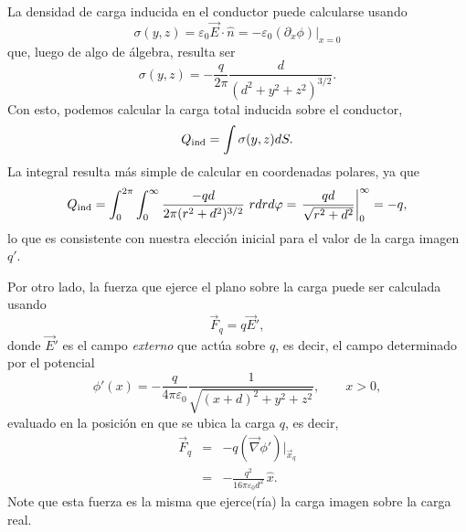 La densidad de carga inducida en el conductor puede calcularse usando
\begin{equation}
 \sigma(y,z)=\varepsilon_0
\vec{E}\cdot\hat{n}=-\varepsilon_0\left.(\partial_x\phi)\right|_{x=0}
\end{equation}
que, luego de algo de álgebra, resulta ser
\begin{equation}
 \sigma(y,z)=-\frac{q}{2\pi}\frac{d}{(d^2+y^2+z^2)^{3/2}}.
\end{equation}
Con esto, podemos calcular la carga total inducida sobre el conductor,
\begin{equation}
Q_{\rm ind} = \int \sigma(y,z) dS.
\end{equation}
La integral resulta más simple de calcular en coordenadas polares, ya que
\begin{equation}
Q_{\rm ind} = \int_0^{2\pi} \int_0^\infty \dfrac{-qd}{2\pi (r^2 + d^2)^{3/2}} \ r  dr  d\varphi = \left. \dfrac{qd}{\sqrt{r^2 + d^2}} \right|_{0}^{\infty} = -q,
\end{equation}
lo que es consistente con nuestra elección inicial para el valor de la carga imagen $q'$.

Por otro lado, la fuerza que ejerce el plano sobre la carga puede ser calculada usando
\begin{equation}
\vec{F}_q=q\vec{E}',
\end{equation}
donde $\vec{E}'$ es el campo \textit{externo} que actúa sobre $q$, es decir, el campo
determinado por el potencial
\begin{equation}
 \phi'(x)=-\frac{q}{4\pi\varepsilon_0}\frac{1}{\sqrt{(x+d)^2+y^2+z^2}},
\qquad x>0,
\end{equation}
evaluado en la posición en que se ubica la carga $q$, es decir,
\begin{eqnarray}
 \vec{F}_q&=&-q(\vec{\nabla}\phi')|_{\vec{x}_q} \\
&=&-\frac{q^2}{16\pi\varepsilon_0d^2}\,\hat{x}.
\end{eqnarray}
Note que esta fuerza es la misma que ejerce(ría) la carga imagen sobre la carga real.


